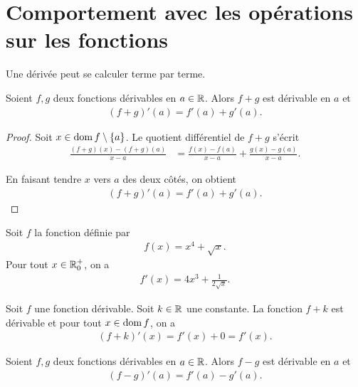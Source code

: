 \documentclass[main.tex]{subfiles}
\begin{document}
\section{Comportement avec les opérations sur les fonctions}

Une dérivée peut se calculer terme par terme.

\begin{proposition}

    Soient $f, g$ deux fonctions dérivables en $a \in \mathbb{R}$.
    Alors $f + g$ est dérivable en $a$ et
    \begin{align}
        (f + g)'(a) = f'(a) + g'(a).
    \end{align}
\end{proposition}
\begin{proof}
    Soit $x \in \operatorname{dom} f \setminus \{a\}$.
    Le quotient différentiel de $f + g$ s'écrit
    \begin{align}
        \frac {(f + g)(x) - (f + g)(a)} {x - a}
        &= \frac {f(x) - f(a)} {x - a} + \frac {g(x) - g(a)} {x - a}.
    \end{align}

    En faisant tendre $x$ vers $a$ des deux côtés,
    on obtient
    \begin{align}
        (f + g)'(a) = f'(a) + g'(a).
    \end{align}
\end{proof}

\begin{example}
    Soit $f$ la fonction définie par 
    \begin{align}
        f(x) = x^4 + \sqrt x.
    \end{align}
    Pour tout $x \in \mathbb{R}_0^+$, on a 
    \begin{align}
        f'(x) = 4x^3 + \frac{1}{2\sqrt x}.
    \end{align}
\end{example}

\begin{example}
    [Dérivée de $f(x) + k$]
    Soit $f$ une fonction dérivable.
    Soit $k \in \mathbb{R}$ une constante. 
    La fonction $f + k$ est dérivable et pour tout $x \in \operatorname{dom} f$, on a 
    \begin{align}
        (f + k)'(x) = f'(x) + 0 = f'(x).
    \end{align}
\end{example}

\begin{proposition}

    Soient $f, g$ deux fonctions dérivables en $a \in \mathbb{R}$.
    Alors $f - g$ est dérivable en $a$ et
    \begin{align}
        (f - g)'(a) = f'(a) - g'(a).
    \end{align}
\end{proposition}
\end{document}
